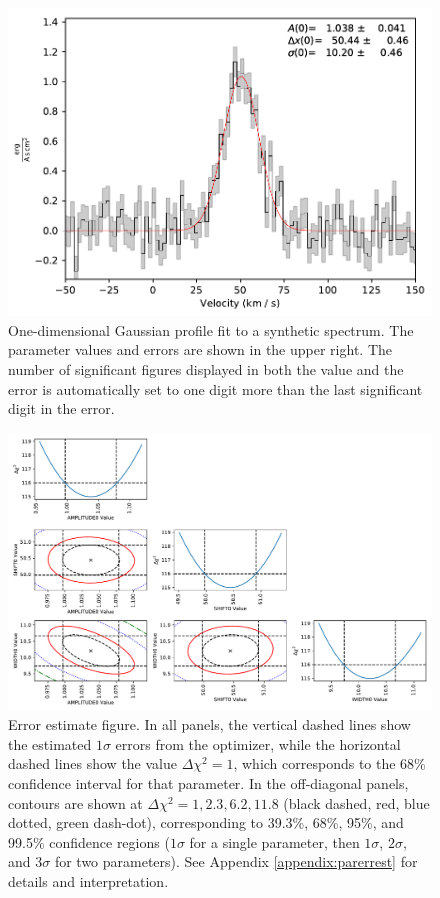 \documentclass[twocolumn,linenumbers]{aastex63}
\begin{document}
\begin{figure}[!htp]
\includegraphics[scale=1,width=7in]{oned_gaussfit_example.pdf}
\caption{One-dimensional Gaussian profile fit to a synthetic spectrum.
The parameter values and errors are shown in the upper right.  The number of
significant figures displayed in both the value and the error is automatically
set to one digit more than the last significant digit in the error.}
\label{fig:synthspecdemo}
\end{figure}


\begin{figure}[!htp]
\includegraphics[scale=1,width=7in]{error_estimate_demonstration.pdf}
\caption{Error estimate figure.
In all panels, the vertical
dashed lines show the estimated $1\sigma$ errors from the optimizer, while the
horizontal dashed lines show the value $\Delta\chi^2=1$, which corresponds to
the 68\% confidence interval for that parameter.
In the off-diagonal panels, contours are shown at $\Delta\chi^2=1,2.3,6.2,11.8$ (black dashed, red, blue dotted, green dash-dot),
corresponding to 39.3\%, 68\%, 95\%, and 99.5\% confidence
regions ($1\sigma$ for a single parameter,
then $1\sigma$, $2\sigma$, and $3\sigma$ for two parameters).
See Appendix \ref{appendix:parerrest} for details and interpretation.}
\label{fig:parerrestdemo}
\end{figure}
\end{document}
